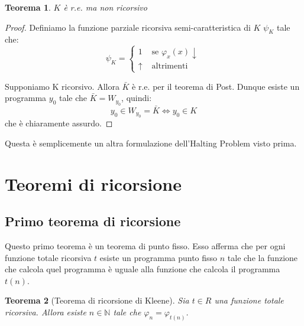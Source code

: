 \documentclass[a4paper,titlepage]{article}
\newtheorem{theorem}{Teorema}[section]
\theoremstyle{definition}
\newcommand{\N}{\mathbb{N}}
\begin{document}
\begin{theorem}
	$K$ è r.e. ma non ricorsivo
\end{theorem}
\begin{proof}
	Definiamo la funzione parziale ricorsiva semi-caratteristica di $K$ $\psi_K$ tale che:
	\[
		\psi_K =
		\begin{cases}
			1 &\text{ se } \varphi_x(x)\downarrow\\
			\uparrow &\text{ altrimenti }
		\end{cases}
	\]
	
	Supponiamo K ricorsivo. Allora $\bar K$ è r.e. per il teorema di Post. Dunque esiste un programma $y_0$ tale che $\bar K = W_{y_0}$, quindi:
	\[
		y_0\in W_{y_0} = \bar K\iff y_0\in K
	\] 
	che è chiaramente assurdo. 
\end{proof}

Questa è semplicemente un altra formulazione dell'Halting Problem visto prima.

\section{Teoremi di ricorsione}
\subsection{Primo teorema di ricorsione}
Questo primo teorema è un teorema di punto fisso. Esso afferma che per ogni funzione totale ricorsiva $t$ esiste un programma punto fisso $n$ tale che la funzione che calcola quel programma è uguale alla funzione che calcola il programma $t(n)$. 

\begin{theorem}[Teorema di ricorsione di Kleene]
	Sia $t\in R$ una funzione totale ricorsiva. Allora esiste $n\in\N$ tale che $\varphi_n=\varphi_{t(n)}$.
\end{theorem}
\end{document}
